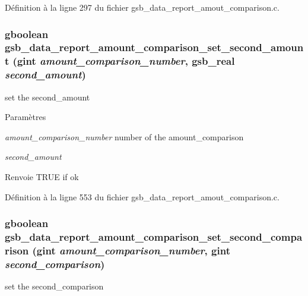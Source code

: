 Définition à la ligne 297 du fichier gsb\_\-data\_\-report\_\-amout\_\-comparison.c.

\subsubsection[{gsb\_\-data\_\-report\_\-amount\_\-comparison\_\-set\_\-second\_\-amount}]{\setlength{\rightskip}{0pt plus 5cm}gboolean gsb\_\-data\_\-report\_\-amount\_\-comparison\_\-set\_\-second\_\-amount (gint {\em amount\_\-comparison\_\-number}, \/  {\bf gsb\_\-real} {\em second\_\-amount})}\label{gsb__data__report__amout__comparison_8h_a2d5858a8324ffa1770b7b2e7d267b6a6}
set the second\_\-amount


\begin{DoxyParams}{Paramètres}
\item[{\em amount\_\-comparison\_\-number}]number of the amount\_\-comparison \item[{\em second\_\-amount}]\end{DoxyParams}
\begin{DoxyReturn}{Renvoie}
TRUE if ok 
\end{DoxyReturn}


Définition à la ligne 553 du fichier gsb\_\-data\_\-report\_\-amout\_\-comparison.c.

\subsubsection[{gsb\_\-data\_\-report\_\-amount\_\-comparison\_\-set\_\-second\_\-comparison}]{\setlength{\rightskip}{0pt plus 5cm}gboolean gsb\_\-data\_\-report\_\-amount\_\-comparison\_\-set\_\-second\_\-comparison (gint {\em amount\_\-comparison\_\-number}, \/  gint {\em second\_\-comparison})}\label{gsb__data__report__amout__comparison_8h_aad69a64a4812fbcd158c43adecfab362}
set the second\_\-comparison


